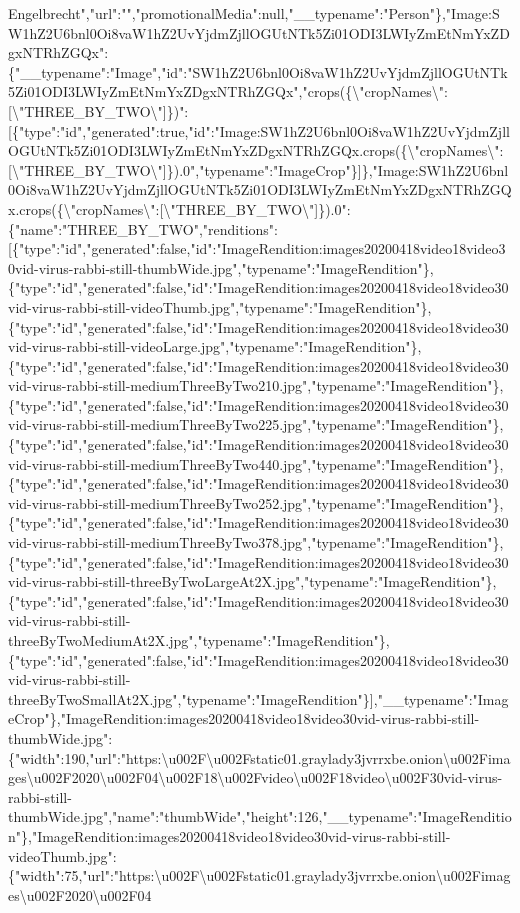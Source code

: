 Engelbrecht","url":"","promotionalMedia":null,"\_\_typename":"Person"\},"Image:SW1hZ2U6bnl0Oi8vaW1hZ2UvYjdmZjllOGUtNTk5Zi01ODI3LWIyZmEtNmYxZDgxNTRhZGQx":\{"\_\_typename":"Image","id":"SW1hZ2U6bnl0Oi8vaW1hZ2UvYjdmZjllOGUtNTk5Zi01ODI3LWIyZmEtNmYxZDgxNTRhZGQx","crops(\{\textbackslash{}"cropNames\textbackslash{}":{[}\textbackslash{}"THREE\_BY\_TWO\textbackslash{}"{]}\})":{[}\{"type":"id","generated":true,"id":"Image:SW1hZ2U6bnl0Oi8vaW1hZ2UvYjdmZjllOGUtNTk5Zi01ODI3LWIyZmEtNmYxZDgxNTRhZGQx.crops(\{\textbackslash{}"cropNames\textbackslash{}":{[}\textbackslash{}"THREE\_BY\_TWO\textbackslash{}"{]}\}).0","typename":"ImageCrop"\}{]}\},"Image:SW1hZ2U6bnl0Oi8vaW1hZ2UvYjdmZjllOGUtNTk5Zi01ODI3LWIyZmEtNmYxZDgxNTRhZGQx.crops(\{\textbackslash{}"cropNames\textbackslash{}":{[}\textbackslash{}"THREE\_BY\_TWO\textbackslash{}"{]}\}).0":\{"name":"THREE\_BY\_TWO","renditions":{[}\{"type":"id","generated":false,"id":"ImageRendition:images20200418video18video30vid-virus-rabbi-still-thumbWide.jpg","typename":"ImageRendition"\},\{"type":"id","generated":false,"id":"ImageRendition:images20200418video18video30vid-virus-rabbi-still-videoThumb.jpg","typename":"ImageRendition"\},\{"type":"id","generated":false,"id":"ImageRendition:images20200418video18video30vid-virus-rabbi-still-videoLarge.jpg","typename":"ImageRendition"\},\{"type":"id","generated":false,"id":"ImageRendition:images20200418video18video30vid-virus-rabbi-still-mediumThreeByTwo210.jpg","typename":"ImageRendition"\},\{"type":"id","generated":false,"id":"ImageRendition:images20200418video18video30vid-virus-rabbi-still-mediumThreeByTwo225.jpg","typename":"ImageRendition"\},\{"type":"id","generated":false,"id":"ImageRendition:images20200418video18video30vid-virus-rabbi-still-mediumThreeByTwo440.jpg","typename":"ImageRendition"\},\{"type":"id","generated":false,"id":"ImageRendition:images20200418video18video30vid-virus-rabbi-still-mediumThreeByTwo252.jpg","typename":"ImageRendition"\},\{"type":"id","generated":false,"id":"ImageRendition:images20200418video18video30vid-virus-rabbi-still-mediumThreeByTwo378.jpg","typename":"ImageRendition"\},\{"type":"id","generated":false,"id":"ImageRendition:images20200418video18video30vid-virus-rabbi-still-threeByTwoLargeAt2X.jpg","typename":"ImageRendition"\},\{"type":"id","generated":false,"id":"ImageRendition:images20200418video18video30vid-virus-rabbi-still-threeByTwoMediumAt2X.jpg","typename":"ImageRendition"\},\{"type":"id","generated":false,"id":"ImageRendition:images20200418video18video30vid-virus-rabbi-still-threeByTwoSmallAt2X.jpg","typename":"ImageRendition"\}{]},"\_\_typename":"ImageCrop"\},"ImageRendition:images20200418video18video30vid-virus-rabbi-still-thumbWide.jpg":\{"width":190,"url":"https:\textbackslash{}u002F\textbackslash{}u002Fstatic01.graylady3jvrrxbe.onion\textbackslash{}u002Fimages\textbackslash{}u002F2020\textbackslash{}u002F04\textbackslash{}u002F18\textbackslash{}u002Fvideo\textbackslash{}u002F18video\textbackslash{}u002F30vid-virus-rabbi-still-thumbWide.jpg","name":"thumbWide","height":126,"\_\_typename":"ImageRendition"\},"ImageRendition:images20200418video18video30vid-virus-rabbi-still-videoThumb.jpg":\{"width":75,"url":"https:\textbackslash{}u002F\textbackslash{}u002Fstatic01.graylady3jvrrxbe.onion\textbackslash{}u002Fimages\textbackslash{}u002F2020\textbackslash{}u002F04\textbacksl